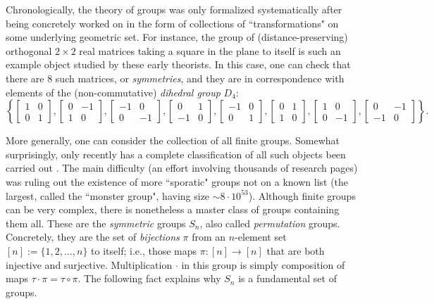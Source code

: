 \documentclass[letterpaper, 10pt]{article}
\theoremstyle{definition}
\begin{document}
Chronologically, the theory of groups was only formalized systematically after being concretely worked on in the form of collections of ``transformations" on some underlying geometric set.  For instance, the group of (distance-preserving) orthogonal $2 \times 2$ real matrices taking a square in the plane to itself is such an example object studied by these early theorists.  In this case, one can check that there are $8$ such matrices, or \textit{symmetries}, and they are in correspondence with elements of the (non-commutative) \textit{dihedral group} $D_4$:
\[ \left\{\left[\begin{array}{cc}1 & 0 \\0 & 1\end{array}\right], \left[\begin{array}{cc}0 & -1 \\ 1 & 0\end{array}\right],
\left[\begin{array}{cc}-1 & 0 \\0 & -1\end{array}\right],\left[\begin{array}{cc}0 & 1 \\-1 & 0\end{array}\right],
\left[\begin{array}{cc}-1 & 0 \\0 & 1\end{array}\right],\left[\begin{array}{cc}0 & 1 \\1 & 0\end{array}\right],
\left[\begin{array}{cc}1 & 0 \\0 & -1\end{array}\right],\left[\begin{array}{cc}0 & -1 \\-1 & 0\end{array}\right] \right\}.\]

More generally, one can consider the collection of all finite groups.  Somewhat surprisingly, only recently has a complete classification of all such objects been carried out \cite{gorenstein2013finite}.  The main difficulty (an effort involving thousands of research pages) was ruling out the existence of more ``sporatic" groups not on a known list (the largest, called the ``monster group", having size $\sim 8 \cdot 10^{53}$).  Although finite groups can be very complex, there is nonetheless a master class of groups containing them all.  These are the \textit{symmetric} groups $S_n$, also called \textit{permutation} groups.  Concretely, they are the set of \textit{bijections} $\pi$ from an $n$-element set $[n] := \{1, 2, \ldots, n\}$ to itself; i.e., those maps $\pi: [n] \to [n]$ that are both injective and surjective.  Multiplication $\cdot$ in this group is simply composition of maps $\tau \cdot \pi = \tau \circ \pi$.  The following fact explains why $S_n$ is a fundamental set of groups.
\end{document}
